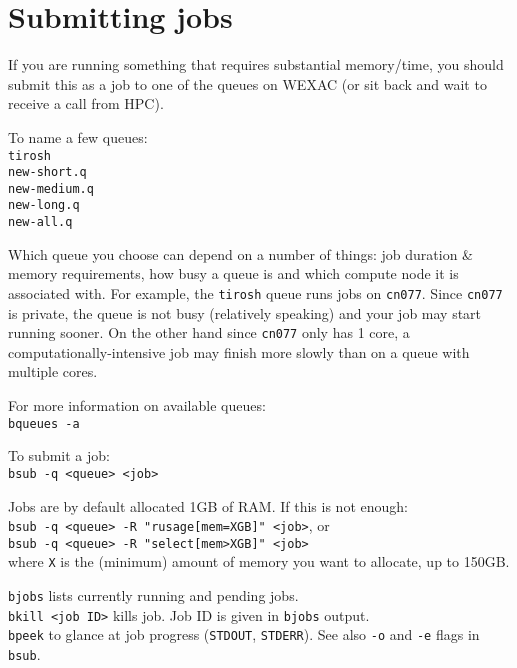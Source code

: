 \documentclass[]{book}
\begin{document}
\section{Submitting jobs}\label{submitting-jobs}

If you are running something that requires substantial memory/time, you
should submit this as a job to one of the queues on WEXAC (or sit back
and wait to receive a call from HPC).

To name a few queues:\\
\texttt{tirosh}\\
\texttt{new-short.q}\\
\texttt{new-medium.q}\\
\texttt{new-long.q}\\
\texttt{new-all.q}

Which queue you choose can depend on a number of things: job duration \&
memory requirements, how busy a queue is and which compute node it is
associated with. For example, the \texttt{tirosh} queue runs jobs on
\texttt{cn077}. Since \texttt{cn077} is private, the queue is not busy
(relatively speaking) and your job may start running sooner. On the
other hand since \texttt{cn077} only has 1 core, a
computationally-intensive job may finish more slowly than on a queue
with multiple cores.

For more information on available queues:\\
\texttt{bqueues\ -a}

To submit a job:\\
\texttt{bsub\ -q\ \textless{}queue\textgreater{}\ \textless{}job\textgreater{}}

Jobs are by default allocated 1GB of RAM. If this is not enough:\\
\texttt{bsub\ -q\ \textless{}queue\textgreater{}\ -R\ "rusage{[}mem=XGB{]}"\ \textless{}job\textgreater{}},
or\\
\texttt{bsub\ -q\ \textless{}queue\textgreater{}\ -R\ "select{[}mem\textgreater{}XGB{]}"\ \textless{}job\textgreater{}}\\
where \texttt{X} is the (minimum) amount of memory you want to allocate,
up to 150GB.

\texttt{bjobs} lists currently running and pending jobs.\\
\texttt{bkill\ \textless{}job\ ID\textgreater{}} kills job. Job ID is
given in \texttt{bjobs} output.\\
\texttt{bpeek} to glance at job progress (\texttt{STDOUT},
\texttt{STDERR}). See also \texttt{-o} and \texttt{-e} flags in
\texttt{bsub}.


\end{document}
